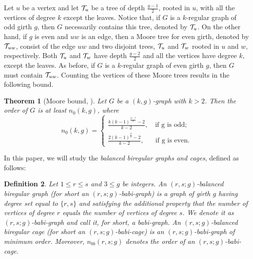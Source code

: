 \documentclass[a4paper,11pt]{article}
\newtheorem{theorem}{Theorem}[section]
\newtheorem{definition}[theorem]{Definition}
\begin{document}
{Let $u$ be a vertex and let ${\cal{T}}_{u}$ be a tree of depth $\frac{g-1}{2}$, rooted in $u$, with all the vertices of degree $k$ except the leaves. Notice that, if $G$ is a $k$-regular graph of odd girth $g$, then $G$ necessarily contains this tree, denoted by  ${\cal{T}}_u$.
On the other hand, if $g$ is even and $uw$ is an edge, then a Moore tree for even girth, denoted by 
${\cal{T}}_{uw}$, consist of the edge $uw$ and two disjoint trees, ${\cal{T}}_u$ and ${\cal{T}}_w$ rooted in $u$ and $w$, respectively. Both ${\cal{T}}_u$ and ${\cal{T}}_w$ have depth $\frac{g-2}{2}$ and 
all the vertices have degree $k$, except the leaves. As before, if $G$ is a $k$-regular graph of even girth $g$, then $G$ must contain ${\cal{T}}_{uw}$. 
Counting the vertices of these Moore trees results in the following bound.
    \begin{theorem}[Moore bound, \cite{ExooJaj08}]
    Let $G$ be a $(k,g)$-graph with $k>2$. Then the order of $G$ is at least $n_0(k,g)$, where
    $$n_0(k,g)= 
\begin{cases}
\frac{k(k-1)^{\frac{g-1}{2}}-2}{k-2}, \quad\text{if g is odd;}\\
\frac{2(k-1)^\frac{g}{2}-2}{k-2}, \quad\text{~~if g is even.}
\end{cases}$$
    \end{theorem}}

In this paper, we will study the \emph{balanced biregular graphs and cages}, defined as follows:
\begin{definition}
Let $1\leq r\leq s$ and $3\leq g$ be integers. An {\emph{$(r,s;g)$-balanced biregular graph}}
(for short an $(r,s;g)$-babi-graph) is a graph of girth $g$ having degree set equal to $\{ r,s\} $ and satisfying the additional property that the number of vertices of degree $r$ equals the number of vertices of degree $s$. We denote it as 
$(r,s;g)$-babi-graph and call it, for short, a babi-graph. An $(r,s;g)$-{\emph{balanced biregular cage}} (for short an $(r,s;g)$-babi-cage) is an $(r,s;g)$-babi-graph of minimum order. Moreover, $n_{bb}(r,s;g)$ denotes the order of an 
$(r,s;g)$-babi-cage.
\end{definition}
\end{document}
